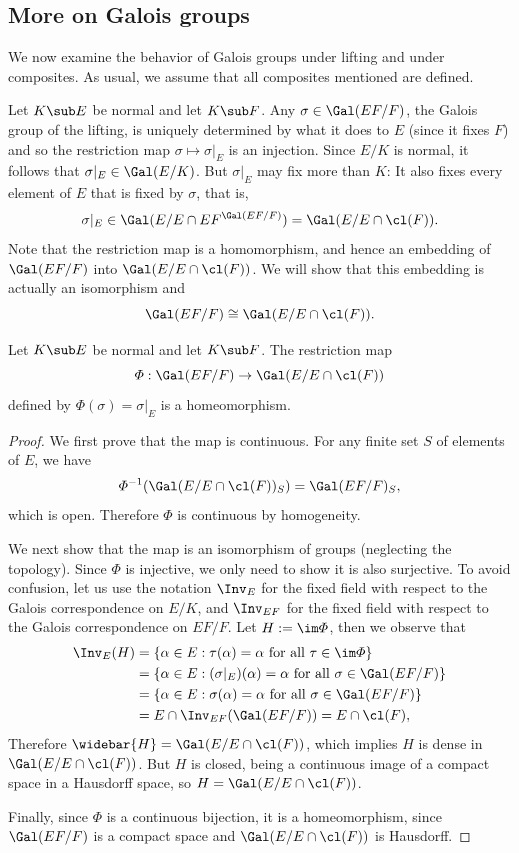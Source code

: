 \subsection{More on Galois groups}
We now examine the behavior of Galois groups under lifting and under
composites. As usual, we assume that all composites mentioned are defined.\par
Let $K\sub E$ be normal and let $K\sub F$. Any $\sigma\in\Gal(EF/F)$, the Galois group of the lifting, is uniquely determined by what it does to $E$ (since it fixes $F$) and so the restriction map $\sigma\mapsto\sigma|_E$ is an injection. Since $E/K$ is normal, it follows that $\sigma|_E\in\Gal(E/K)$. But $\sigma|_E$ may fix more than $K$: It also fixes every element of $E$ that is fixed by $\sigma$, that is,
\[\sigma|_E\in\Gal(E/E\cap EF^{\Gal(EF/F)})=\Gal(E/E\cap\cl(F)).\]
Note that the restriction map is a homomorphism, and hence an embedding of $\Gal(EF/F)$ into $\Gal(E/E\cap\cl(F))$. We will show that this embedding is actually an isomorphism and
\[\Gal(EF/F)\cong \Gal(E/E\cap\cl(F)).\]
\begin{proposition}\label{Galois group of lifting normal case}
Let $K\sub E$ be normal and let $K\sub F$. The restriction map
\[\varPhi:\Gal(EF/F)\to\Gal(E/E\cap\cl(F))\]
defined by $\varPhi(\sigma)=\sigma|_E$ is a homeomorphism.
\end{proposition}
\begin{proof}
We first prove that the map is continuous. For any finite set $S$ of elements of $E$, we have
\[\varPhi^{-1}(\Gal(E/E\cap\cl(F))_{S})=\Gal(EF/F)_S,\]
which is open. Therefore $\varPhi$ is continuous by homogeneity.\par
We next show that the map is an isomorphism of groups (neglecting the topology). Since $\varPhi$ is injective, we only need to show it is also surjective. To avoid confusion, let us use the notation $\Inv_E$ for the fixed field with respect to the Galois correspondence on $E/K$, and $\Inv_{EF}$ for the fixed field with respect to the Galois correspondence on $EF/F$. Let $H:=\im\varPhi$, then we observe that
\begin{align*}
\Inv_E(H)&=\{\alpha\in E:\tau(\alpha)=\alpha\text{ for all }\tau\in\im\varPhi\}\\
&=\{\alpha\in E:(\sigma|_E)(\alpha)=\alpha\text{ for all }\sigma\in\Gal(EF/F)\}\\
&=\{\alpha\in E:\sigma(\alpha)=\alpha\text{ for all }\sigma\in\Gal(EF/F)\}\\
&=E\cap\Inv_{EF}(\Gal(EF/F))=E\cap\cl(F),
\end{align*}
Therefore $\widebar{H}=\Gal(E/E\cap\cl(F))$, which implies $H$ is dense in $\Gal(E/E\cap\cl(F))$. But $H$ is closed, being a continuous image of a compact space in a Hausdorff space, so $H=\Gal(E/E\cap\cl(F))$.\par
Finally, since $\varPhi$ is a continuous bijection, it is a homeomorphism, since $\Gal(EF/F)$ is a compact space and $\Gal(E/E\cap\cl(F))$ is Hausdorff.
\end{proof}
